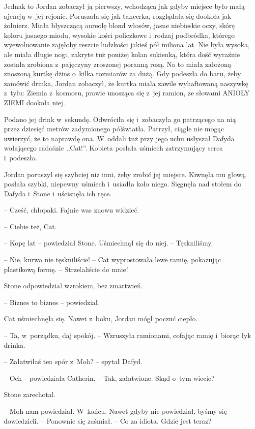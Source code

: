 \documentclass[oneside,polish,11pt,sfheadings]{mwbk}
\begin{document}
Jednak to Jordan zobaczył ją pierwszy, wchodzącą jak gdyby miejsce było
małą ajencją w~jej rejonie. Poruszała się jak tancerka, rozglądała się
dookoła jak żołnierz. Miała błyszczącą aureolę blond włosów, jasne
niebieskie oczy, skórę koloru jasnego miodu, wysokie kości policzkowe i~rodzaj podbródka, którego wyewoluowanie zajęłoby reszcie ludzkości
jakieś pół miliona lat. Nie była wysoka, ale miała długie nogi, zakryte
tuż poniżej kolan sukienką, która dość wyraźnie została zrobiona z~pajęczyny zroszonej poranną rosą. Na to miała założoną znoszoną kurtkę
dżins o~kilka rozmiarów za dużą. Gdy podeszła do baru, żeby zamówić
drinka, Jordan zobaczył, że kurtka miała zawile wyhaftowaną naszywkę z~tyłu: Ziemia z~kosmosu, prawie unosząca się z~jej ramion, ze słowami
ANIOŁY ZIEMI dookoła niej.

Podano jej drink w~sekundę. Odwróciła się i~zobaczyła go patrzącego na
nią przez dziesięć metrów zadymionego półświatła. Patrzył, ciągle nie
mogąc uwierzyć, że to naprawdę ona. W~oddali tuż przy jego uchu usłyszał
Dafyda wołającego radośnie ,,Cat!''. Kobieta posłała uśmiech zatrzymujący
serca i~podeszła.

Jordan poruszył się szybciej niż inni, żeby zrobić jej miejsce. Kiwnęła
mu głową, posłała szybki, niepewny uśmiech i~usiadła koło niego.
Sięgnęła nad stołem do Dafyda i~Stone i~uścisnęła ich ręce.

-- Cześć, chłopaki. Fajnie was znowu widzieć.

-- Ciebie też, Cat.

-- Kopę lat -- powiedział Stone. Uśmiechnął się do niej. -- Tęskniliśmy.

-- Nie, kurwa nie tęskniliście! -- Cat wyprostowała lewe ramię, pokazując
plastikową formę. -- Strzelaliście do mnie!

Stone odpowiedział wzrokiem, bez zmartwień. 

-- Biznes to biznes -- powiedział.

Cat uśmiechnęła się. Nawet z~boku, Jordan mógł poczuć ciepło.

-- Ta, w~porządku, daj spokój. -- Wzruszyła ramionami, cofając ramię i~biorąc łyk drinka.

-- Załatwiłaś ten spór z~Moh? -- spytał Dafyd.

-- Och -- powiedziała Catherin. -- Tak, załatwione. Skąd o~tym wiecie?

Stone zarechotał. 

-- Moh nam powiedział. W~końcu. Nawet gdyby nie
powiedział, byśmy się dowiedzieli. -- Ponownie się zaśmiał. -- Co za
idiota. Gdzie jest teraz?
\end{document}
